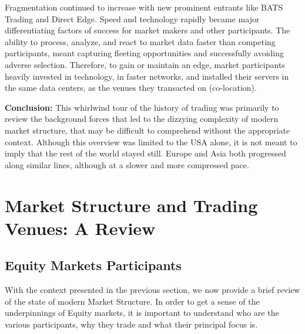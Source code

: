 Fragmentation continued to increase with new prominent entrants like BATS Trading and Direct Edge.  Speed and technology rapidly became major differentiating factors of success for market makers and other participants. The ability to process, analyze, and react to market data faster than competing participants, meant capturing fleeting opportunities and successfully avoiding adverse selection. Therefore, to gain or maintain an edge, market participants heavily invested in technology, in faster networks, and installed their servers in the same data centers, as the venues they transacted on (co-location). \twomedskip


\noindent\textbf{Conclusion:} This whirlwind tour of the history of trading was primarily to review the background forces that led to the dizzying complexity of modern market structure, that may be difficult to comprehend without the appropriate context. Although this overview was limited to the USA alone, it is not meant to imply that the rest of the world stayed still. Europe and Asia both progressed along similar lines, although at a slower and more compressed pace.



\section{Market Structure and Trading Venues: A Review}

\subsection{Equity Markets Participants} 

With the context presented in the previous section, we now provide a brief review of the state of modern Market Structure. In order to get a sense of the underpinnings of Equity markets, it is important to understand who are the various participants, why they trade and what their principal focus is. \twomedskip


